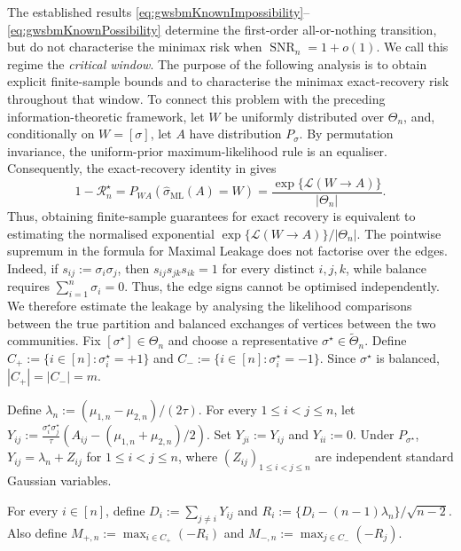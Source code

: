 \documentclass[11pt]{article}
\theoremstyle{definition}
\theoremstyle{remark}
\newcommand{\1}{\boldsymbol{1}}
\newcommand{\ml}[2]{\mathcal{L}(#1\!\to\!#2)}
\begin{document}
The established results
\eqref{eq:gwsbmKnownImpossibility}--\eqref{eq:gwsbmKnownPossibility}
determine the first-order all-or-nothing transition, but do not
characterise the minimax risk when
\(\operatorname{SNR}_n=1+o(1)\). We call this regime the \emph{critical
window}. The purpose of the following analysis is to obtain explicit
finite-sample bounds and to characterise the minimax exact-recovery risk
throughout that window.
To connect this problem with the preceding information-theoretic
framework, let $W$ be uniformly distributed over $\Theta_n$, and,
conditionally on $W=[\sigma]$, let $A$ have distribution $P_\sigma$.
By permutation invariance, the uniform-prior maximum-likelihood rule is
an equaliser. Consequently, the exact-recovery identity in
 gives
\begin{equation}
1-\mathcal R_n^\star
=
P_{WA}
\left(
\widehat\sigma_{\mathrm{ML}}(A)=W
\right)
=
\frac{\exp\{\ml{W}{A}\}}{|\Theta_n|}.
\label{eq:gwsbmLeakageRiskIdentity}
\end{equation}
Thus, obtaining finite-sample guarantees for exact recovery is equivalent
to estimating the normalised exponential
\(\exp\{\ml{W}{A}\}/|\Theta_n|\).
The pointwise supremum in the formula for Maximal Leakage does not factorise
over the edges. Indeed, if $s_{ij}:=\sigma_i\sigma_j$, then
$s_{ij}s_{jk}s_{ik}=1$ for every distinct $i,j,k$, while balance requires
$\sum_{i=1}^n\sigma_i=0$. Thus, the edge signs cannot be optimised
independently. We therefore estimate the leakage by
analysing the likelihood comparisons between the true partition and
balanced exchanges of vertices between the two communities.
Fix $[\sigma^\star]\in\Theta_n$ and choose a representative
$\sigma^\star\in\widetilde\Theta_n$. Define
\(C_+:=\{i\in[n]:\sigma_i^\star=+1\}\) and
\(C_-:=\{i\in[n]:\sigma_i^\star=-1\}\).
Since $\sigma^\star$ is balanced, \(|C_+|=|C_-|=m\).

Define \(\lambda_n:=(\mu_{1,n}-\mu_{2,n})/(2\tau)\).
For every $1\leq i<j\leq n$, let
\(Y_{ij}:=\frac{\sigma_i^\star\sigma_j^\star}{\tau}
(A_{ij}-(\mu_{1,n}+\mu_{2,n})/2)\).
Set \(Y_{ji}:=Y_{ij}\) and \(Y_{ii}:=0\). Under
$P_{\sigma^\star}$, \(Y_{ij}=\lambda_n+Z_{ij}\) for
\(1\leq i<j\leq n\), where
\((Z_{ij})_{1\leq i<j\leq n}\) are independent standard Gaussian
variables.

For every $i\in[n]$, define \(D_i:=\sum_{j\neq i}Y_{ij}\) and
\(R_i:=\{D_i-(n-1)\lambda_n\}/\sqrt{n-2}\). Also define
\(M_{+,n}:=\max_{i\in C_+}(-R_i)\) and
\(M_{-,n}:=\max_{j\in C_-}(-R_j)\).
\end{document}
